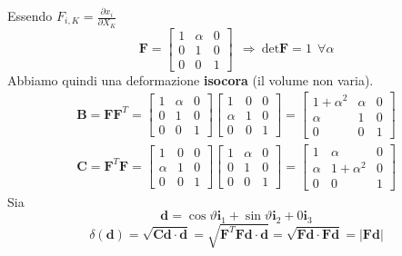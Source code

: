 \documentclass[10pt,a4paper,twoside]{book}
\begin{document}
Essendo $F_{i,K} =\frac{\partial x_{i}}{\partial X_{K}}$
\begin{equation*}
\mathbf{F} =\begin{bmatrix}
1 & \alpha  & 0\\
0 & 1 & 0\\
0 & 0 & 1
\end{bmatrix} \ \ \Rightarrow \ \mathrm{det}\mathbf{F} =1\ \ \forall \alpha 
\end{equation*}
Abbiamo quindi una deformazione \textbf{isocora} (il volume non varia).
\begin{gather*}
\mathbf{B} =\mathbf{FF}^{T} =\begin{bmatrix}
1 & \alpha  & 0\\
0 & 1 & 0\\
0 & 0 & 1
\end{bmatrix}\begin{bmatrix}
1 & 0 & 0\\
\alpha  & 1 & 0\\
0 & 0 & 1
\end{bmatrix} =\begin{bmatrix}
1+\alpha ^{2} & \alpha  & 0\\
\alpha  & 1 & 0\\
0 & 0 & 1
\end{bmatrix}\\
\mathbf{C} =\mathbf{F}^{T}\mathbf{F} =\begin{bmatrix}
1 & 0 & 0\\
\alpha  & 1 & 0\\
0 & 0 & 1
\end{bmatrix}\begin{bmatrix}
1 & \alpha  & 0\\
0 & 1 & 0\\
0 & 0 & 1
\end{bmatrix} =\begin{bmatrix}
1 & \alpha  & 0\\
\alpha  & 1+\alpha ^{2} & 0\\
0 & 0 & 1
\end{bmatrix}
\end{gather*}
Sia
\begin{equation*}
\mathbf{d} =\cos \vartheta \mathbf{i}_{1} +\sin \vartheta \mathbf{i}_{2} +0\mathbf{i}_{3}
\end{equation*}
\begin{equation*}
\delta (\mathbf{d} )=\sqrt{\mathbf{Cd} \cdot \mathbf{d}} =\sqrt{\mathbf{F}^{T}\mathbf{Fd} \cdot \mathbf{d}} =\sqrt{\mathbf{Fd} \cdot \mathbf{Fd}} =| \mathbf{Fd}| 
\end{equation*}
\end{document}
